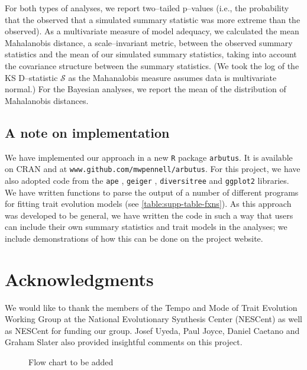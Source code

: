\documentclass[a4paper,12pt]{article}
\begin{document}
For both types of analyses, we report two--tailed p--values (i.e., the probability that the observed that a simulated summary statistic was more extreme than the observed). As a multivariate measure of model adequacy, we calculated the mean Mahalanobis distance, a scale--invariant metric, between the observed summary statistics and the mean of our simulated summary statistics, taking into account the covariance structure between the summary statistics. (We took the log of the KS D--statistic $\mathcal{S}$ as the Mahanalobis measure assumes data is multivariate normal.) For the Bayesian analyses, we report the mean of the distribution of Mahalanobis distances. 

\subsection{A note on implementation}

We have implemented our approach in a new \texttt{R} package \texttt{arbutus}. It is available on CRAN and at \texttt{www.github.com/mwpennell/arbutus}. For this project, we have also adopted code from the \texttt{ape} \citep{ape}, \texttt{geiger} \citep{geiger}, \texttt{diversitree} \citep{FitzJohn2012} and \texttt{ggplot2} \citep{ggplot2} libraries. We have written functions to parse the output of a number of different programs for fitting trait evolution models (see \ref{table:supp-table-fxns}). As this approach was developed to be general, we have written the code in such a way that users can include their own summary statistics and trait models in the analyses; we include demonstrations of how this can be done on the project website.

\section{Acknowledgments}
We would like to thank the members of the Tempo and Mode of Trait Evolution Working Group at the National Evolutionary Synthesis Center (NESCent) as well as NESCent for funding our group. Josef Uyeda, Paul Joyce, Daniel Caetano and Graham Slater also provided insightful comments on this project.

\newpage



\begin{figure}[p]
  \centering
  \caption{Flow chart to be added}
  \label{fig:flowchart}
\end{figure}
\end{document}
